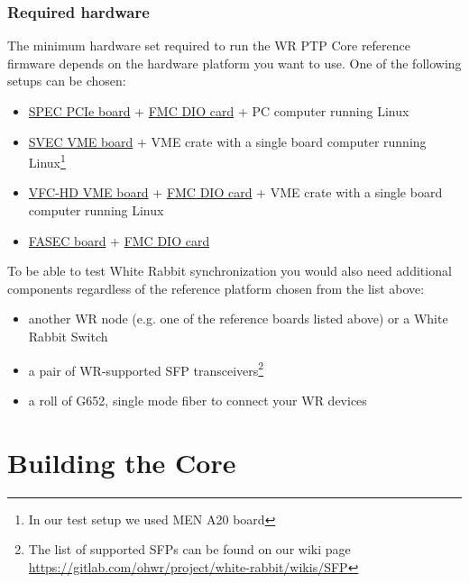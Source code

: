 \documentclass[a4paper, 12pt]{article}
\renewcommand{\_}{\underscore\allowbreak}
\begin{document}
\subsubsection{Required hardware}
\label{Required hardware}

The minimum hardware set required to run the WR PTP Core reference firmware
depends on the hardware platform you want to use. One of the following setups
can be chosen:
\begin{itemize}
\item \href{https://gitlab.com/ohwr/project/spec/wikis}{SPEC PCIe board} +
  \href{https://gitlab.com/ohwr/project/fmc-dio-5chttla/wikis}{FMC DIO card} + PC
  computer running Linux
\item \href{https://gitlab.com/ohwr/project/svec/wikis}{SVEC VME board} + VME crate with
  a single board computer running Linux\footnote{\label{note_a20}In our test setup
    we used MEN A20 board}
\item \href{https://gitlab.com/ohwr/project/vfc-hd/wikis}{VFC-HD VME board} +
  \href{https://gitlab.com/ohwr/project/fmc-dio-5chttla/wikis}{FMC DIO card} +
  VME crate with a single board computer running Linux
\item \href{https://gitlab.com/ohwr/project/fasec/wikis}{FASEC board} +
  \href{https://gitlab.com/ohwr/project/fmc-dio-5chttla/wikis}{FMC DIO card}
\end{itemize}

To be able to test White Rabbit synchronization you would also need
additional components regardless of the reference platform chosen from the list
above:
\begin{itemize}
  \item another WR node (e.g. one of the reference boards listed above) or a
    White Rabbit Switch
  \item a pair of WR-supported SFP transceivers\footnote{The list of supported
    SFPs can be found on our wiki page
    \url{https://gitlab.com/ohwr/project/white-rabbit/wikis/SFP}}
  \item a roll of G652, single mode fiber to connect your WR devices
\end{itemize}

\newpage
\section{Building the Core}
\label{Building the Core}
\end{document}
